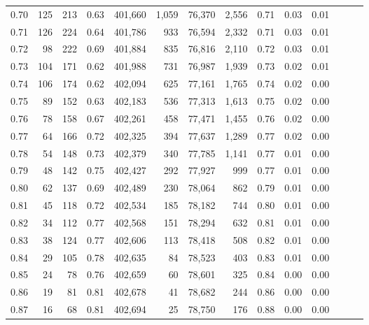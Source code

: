 \begin{tabular}{rrrrrrrrrrrrrr}
0.70 &     125 &    213 &  0.63 &  401,660 &    1,059 &  76,370 &   2,556 &  0.71 &  0.03 &      0.01 \\
0.71 &     126 &    224 &  0.64 &  401,786 &      933 &  76,594 &   2,332 &  0.71 &  0.03 &      0.01 \\
0.72 &      98 &    222 &  0.69 &  401,884 &      835 &  76,816 &   2,110 &  0.72 &  0.03 &      0.01 \\
0.73 &     104 &    171 &  0.62 &  401,988 &      731 &  76,987 &   1,939 &  0.73 &  0.02 &      0.01 \\
0.74 &     106 &    174 &  0.62 &  402,094 &      625 &  77,161 &   1,765 &  0.74 &  0.02 &      0.00 \\
0.75 &      89 &    152 &  0.63 &  402,183 &      536 &  77,313 &   1,613 &  0.75 &  0.02 &      0.00 \\
0.76 &      78 &    158 &  0.67 &  402,261 &      458 &  77,471 &   1,455 &  0.76 &  0.02 &      0.00 \\
0.77 &      64 &    166 &  0.72 &  402,325 &      394 &  77,637 &   1,289 &  0.77 &  0.02 &      0.00 \\
0.78 &      54 &    148 &  0.73 &  402,379 &      340 &  77,785 &   1,141 &  0.77 &  0.01 &      0.00 \\
0.79 &      48 &    142 &  0.75 &  402,427 &      292 &  77,927 &     999 &  0.77 &  0.01 &      0.00 \\
0.80 &      62 &    137 &  0.69 &  402,489 &      230 &  78,064 &     862 &  0.79 &  0.01 &      0.00 \\
0.81 &      45 &    118 &  0.72 &  402,534 &      185 &  78,182 &     744 &  0.80 &  0.01 &      0.00 \\
0.82 &      34 &    112 &  0.77 &  402,568 &      151 &  78,294 &     632 &  0.81 &  0.01 &      0.00 \\
0.83 &      38 &    124 &  0.77 &  402,606 &      113 &  78,418 &     508 &  0.82 &  0.01 &      0.00 \\
0.84 &      29 &    105 &  0.78 &  402,635 &       84 &  78,523 &     403 &  0.83 &  0.01 &      0.00 \\
0.85 &      24 &     78 &  0.76 &  402,659 &       60 &  78,601 &     325 &  0.84 &  0.00 &      0.00 \\
0.86 &      19 &     81 &  0.81 &  402,678 &       41 &  78,682 &     244 &  0.86 &  0.00 &      0.00 \\
0.87 &      16 &     68 &  0.81 &  402,694 &       25 &  78,750 &     176 &  0.88 &  0.00 &      0.00 \\

\end{tabular}
